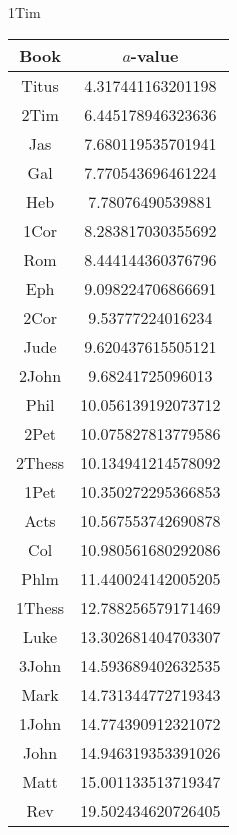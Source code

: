 \documentclass[12pt,letterpaper]{article}
\begin{document}
1Tim
\begin{longtable}{|c|c|}
\hline
 Book & $a$-value \\ \hline
Titus & 4.317441163201198 \\ \hline
 2Tim & 6.445178946323636 \\ \hline
 Jas & 7.680119535701941 \\ \hline
 Gal & 7.770543696461224 \\ \hline
 Heb & 7.78076490539881 \\ \hline
 1Cor & 8.283817030355692 \\ \hline
 Rom & 8.444144360376796 \\ \hline
 Eph & 9.098224706866691 \\ \hline
 2Cor & 9.53777224016234 \\ \hline
 Jude & 9.620437615505121 \\ \hline
 2John & 9.68241725096013 \\ \hline
 Phil & 10.056139192073712 \\ \hline
 2Pet & 10.075827813779586 \\ \hline
 2Thess & 10.134941214578092 \\ \hline
 1Pet & 10.350272295366853 \\ \hline
 Acts & 10.567553742690878 \\ \hline
 Col & 10.980561680292086 \\ \hline
 Phlm & 11.440024142005205 \\ \hline
 1Thess & 12.788256579171469 \\ \hline
 Luke & 13.302681404703307 \\ \hline
 3John & 14.593689402632535 \\ \hline
 Mark & 14.731344772719343 \\ \hline
 1John & 14.774390912321072 \\ \hline
 John & 14.946319353391026 \\ \hline
 Matt & 15.001133513719347 \\ \hline
 Rev & 19.502434620726405 \\ \hline 
\end{longtable}
\end{document}
